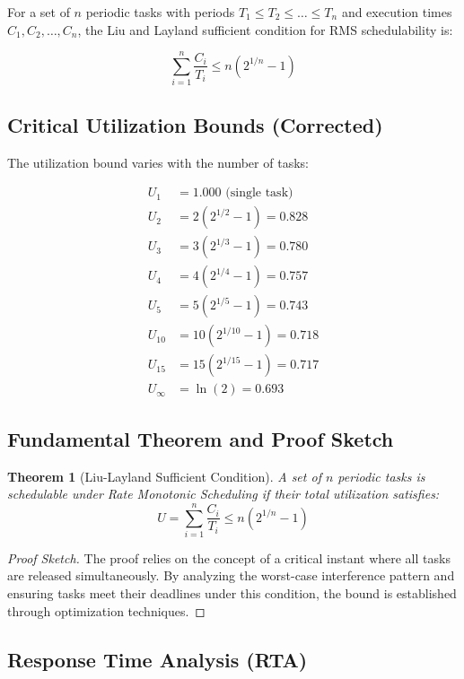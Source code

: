 \documentclass[12pt,a4paper]{article}
\newtheorem{theorem}{Theorem}
\begin{document}
For a set of $n$ periodic tasks with periods $T_1 \leq T_2 \leq \ldots \leq T_n$ and execution times $C_1, C_2, \ldots, C_n$, the Liu and Layland sufficient condition for RMS schedulability is:

\begin{equation}
\sum_{i=1}^{n} \frac{C_i}{T_i} \leq n(2^{1/n} - 1)
\end{equation}

\subsection{Critical Utilization Bounds (Corrected)}

The utilization bound varies with the number of tasks:

\begin{align}
U_1 &= 1.000 \text{ (single task)} \\
U_2 &= 2(2^{1/2} - 1) = 0.828 \\
U_3 &= 3(2^{1/3} - 1) = 0.780 \\
U_4 &= 4(2^{1/4} - 1) = 0.757 \\
U_5 &= 5(2^{1/5} - 1) = 0.743 \\
U_{10} &= 10(2^{1/10} - 1) = 0.718 \\
U_{15} &= 15(2^{1/15} - 1) = 0.717 \\
U_{\infty} &= \ln(2) = 0.693
\end{align}

\subsection{Fundamental Theorem and Proof Sketch}

\begin{theorem}[Liu-Layland Sufficient Condition]
A set of $n$ periodic tasks is schedulable under Rate Monotonic Scheduling if their total utilization satisfies:
$$U = \sum_{i=1}^{n} \frac{C_i}{T_i} \leq n(2^{1/n} - 1)$$
\end{theorem}

\begin{proof}[Proof Sketch]
The proof relies on the concept of a critical instant where all tasks are released simultaneously. By analyzing the worst-case interference pattern and ensuring tasks meet their deadlines under this condition, the bound is established through optimization techniques.
\end{proof}

\subsection{Response Time Analysis (RTA)}
\end{document}
